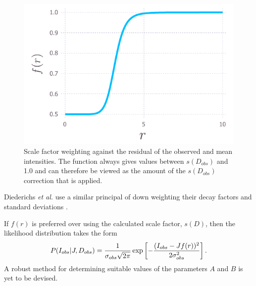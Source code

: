 \begin{figure}
  \centering
    \includegraphics[width=1\textwidth]{figures/zde/scale_factor_function.pdf}
    \caption{Scale factor weighting against the residual of the observed and mean intensities.
    The function always gives values between $s(D_{obs})$ and 1.0 and can therefore be viewed as the amount of the $s(D_{obs})$ correction that is applied.}
    \label{fig:Scale factor weighting - Extrapolation method}
\end{figure}
Diederichs \textit{et al.} \cite{diederichs2003} use a similar principal of down weighting their decay factors and standard deviations \cite{diederichs2003}.

If $f(r)$ is preferred over using the calculated scale factor, $s(D)$, then the likelihood distribution takes the form
\begin{equation}
    P(I_{obs} | J, D_{obs}) = \frac{1}{\sigma_{obs} \sqrt{2\pi}} \exp \left[-\frac{(I_{obs} - J f(r))^2}{2 \sigma^2_{obs}} \right].
    \label{eq:Normally distributed intensity with weighted scale factor - Extrapolation method}
\end{equation}
A robust method for determining suitable values of the parameters $A$ and $B$ is yet to be devised.

